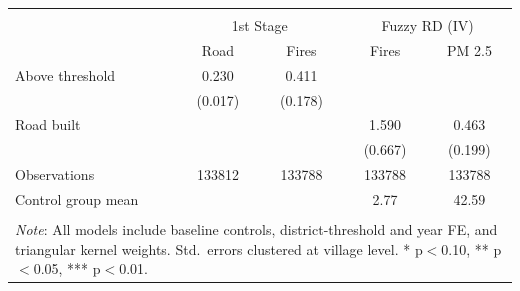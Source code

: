 \begin{tabular}{l*{4}{c}} 
\\[-1.8ex]\hline \hline \\[-1.8ex] 
& \multicolumn{2}{c}{1st Stage} 
& \multicolumn{2}{c}{Fuzzy RD (IV)}
 \\ \midrule
                    &\multicolumn{1}{c}{Road}&\multicolumn{1}{c}{Fires}&\multicolumn{1}{c}{Fires}&\multicolumn{1}{c}{PM 2.5}\\
\midrule
Above threshold     &       0.230\sym{***}&       0.411\sym{**} &                     &                     \\
                    &     (0.017)         &     (0.178)         &                     &                     \\
Road built          &                     &                     &       1.590\sym{**} &       0.463\sym{**} \\
                    &                     &                     &     (0.667)         &     (0.199)         \\
\midrule
Observations        &      133812         &      133788         &      133788         &      133788         \\
Control group mean  &                     &                     &        2.77         &       42.59         \\
\hline \hline \\[-1.8ex] 
\multicolumn{5}{p{\linewidth}}{\small 
\noindent \textit{Note}: All models 
include baseline controls, 
district-threshold and year FE, and 
triangular kernel weights. Std.\ errors 
clustered at village level. 
* p$<$0.10, ** p$<$0.05, 
*** p$<$0.01.} 
\end{tabular}
